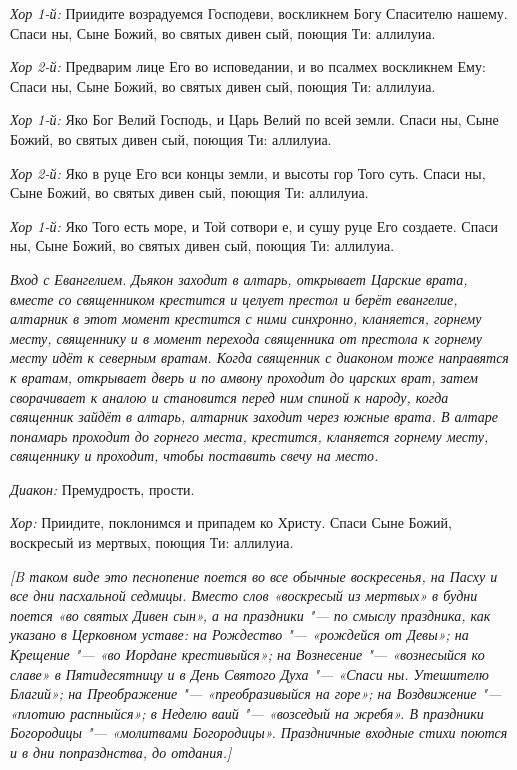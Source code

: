\begin{mymulticols}
{\itshape Хор 1-й:} Приидите возрадуемся Господеви, воскликнем Богу Спасителю нашему. Спаси ны, Сыне Божий, во святых дивен сый, поющия Ти: аллилуиа. 


{\itshape Хор 2-й:} Предварим лице Его во исповедании, и во псалмех воскликнем Ему: Спаси ны, Сыне Божий, во святых дивен сый, поющия Ти: аллилуиа. 


{\itshape Хор 1-й:} Яко Бог Велий Господь, и Царь Велий по всей земли. Спаси ны, Сыне Божий, во святых дивен сый, поющия Ти: аллилуиа. 


{\itshape Хор 2-й:} Яко в руце Его вси концы земли, и высоты гор Того суть. Спаси ны, Сыне Божий, во святых дивен сый, поющия Ти: аллилуиа. 


{\itshape Хор 1-й:} Яко Того есть море, и Той сотвори е, и сушу руце Его создаете. Спаси ны, Сыне Божий, во святых дивен сый, поющия Ти: аллилуиа. 


{\itshape Вход с Евангелием. Дьякон заходит в алтарь, открывает Царские врата, вместе со священником крестится и целует престол и берёт евангелие, алтарник в этот момент крестится с ними синхронно, кланяется, горнему месту, священнику и в момент перехода священника от престола к горнему месту идёт к северным вратам. Когда священник с диаконом тоже направятся к вратам, открывает дверь и по амвону проходит до царских врат, затем сворачивает к аналою и становится перед ним спиной к народу, когда священник зайдёт в алтарь, алтарник заходит через южные врата. В алтаре понамарь проходит до горнего места, крестится, кланяется горнему месту, священнику и проходит, чтобы поставить свечу на место.}

{\itshape Диакон:} Премудрость, прости.


 {\itshape Хор:} Приидите, поклонимся и припадем ко Христу. Спаси Сыне Божий, воскресый из мертвых, поющия Ти: аллилуиа.


{\itshape [B таком виде это песнопение поется во все обычные воскресенья, на Пасху и все дни пасхальной седмицы. Вместо слов «воскресый из мертвых» в будни поется «во святых Дивен сын», а на праздники "--- по смыслу праздника, как указано в Церковном уставе: на Рождество "--- «рождейся от Девы»; на Крещение "--- «во Иордане крестивыйся»; на Вознесение "--- «вознесыйся ко славе» в Пятидесятницу и в День Святого Духа "--- «Спаси ны. Утешителю Благий»; на Преображение "--- «преобразивыйся на горе»; на Воздвижение "--- «плотию распныйся»; в Неделю ваий "--- «возседый на жребя». В праздники Богородицы "--- «молитвами Богородицы». Праздничные входные стихи поются и в дни попразднства, до отдания.]}



\end{mymulticols}
